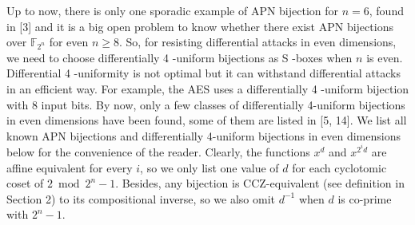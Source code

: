 \documentclass[10pt]{article}
\begin{document}
Up to now, there is only one sporadic example of APN bijection for $n=6$, found in [3] and it is a big open problem to know whether there exist APN bijections over $\mathbb{F}_{2^{n}}$ for even $n \geq 8$. So, for resisting differential attacks in even dimensions, we need to choose differentially 4 -uniform bijections as S -boxes when $n$ is even. Differential 4 -uniformity is not optimal but it can withstand differential attacks in an efficient way. For example, the AES uses a differentially 4 -uniform bijection with 8 input bits. By now, only a few classes of differentially 4-uniform bijections in even dimensions have been found, some of them are listed in [5, 14]. We list all known APN bijections and differentially 4-uniform bijections in even dimensions below for the convenience of the reader. Clearly, the functions $x^{d}$ and $x^{2^{i} d}$ are affine equivalent for every $i$, so we only list one value of $d$ for each cyclotomic coset of $2 \bmod 2^{n}-1$. Besides, any bijection is CCZ-equivalent (see definition in Section 2) to its compositional inverse, so we also omit $d^{-1}$ when $d$ is co-prime with $2^{n}-1$.
\end{document}
